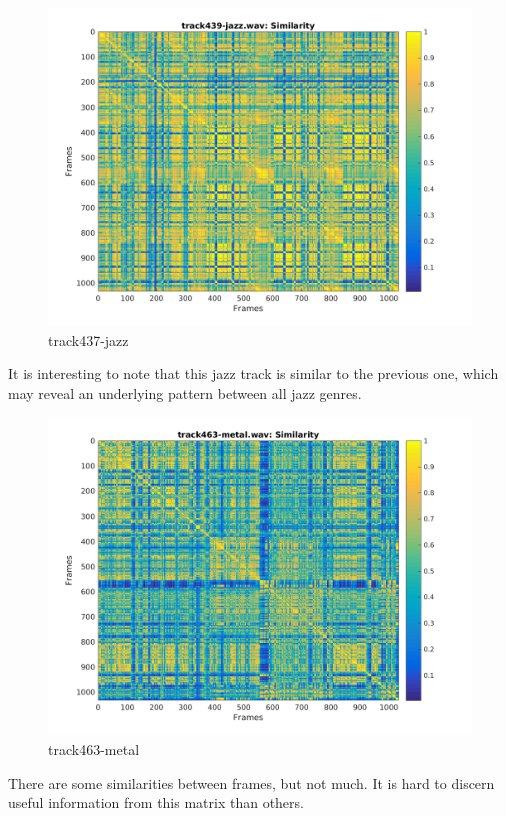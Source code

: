 \documentclass[11pt, a4paper]{article}
\begin{document}
\begin{figure}[H]
    \centering
    \includegraphics[width=.8\textwidth]{track439-jazz-similarity.png}
    \caption{track437-jazz}
\end{figure}

It is interesting to note that this jazz track is similar to the previous one, which may reveal an underlying pattern between all jazz genres. 

\begin{figure}[H]
    \centering
    \includegraphics[width=.8\textwidth]{track463-metal-similarity.png}
    \caption{track463-metal}
\end{figure} 

There are some similarities between frames, but not much. It is hard to discern useful information from this matrix than others. 
\end{document}
